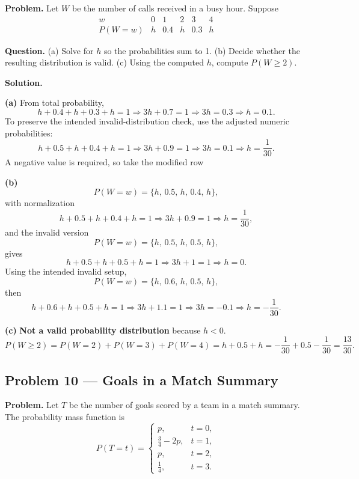\begin{ExamProblems}
		\textbf{Problem.}
		Let $W$ be the number of calls received in a busy hour. Suppose
		\[
		\begin{array}{c|ccccc}
			w & 0 & 1 & 2 & 3 & 4\\
			\hline
			P(W=w) & h & 0.4 & h & 0.3 & h
		\end{array}
		\]
		
		\textbf{Question.}
		(a) Solve for $h$ so the probabilities sum to 1.
		(b) Decide whether the resulting distribution is valid.
		(c) Using the computed $h$, compute $P(W\ge 2)$.
		
		\textbf{Solution.}

		\textbf{(a)} From total probability,
		\[
		h+0.4+h+0.3+h=1\Rightarrow 3h+0.7=1\Rightarrow 3h=0.3\Rightarrow h=0.1.
		\]
		To preserve the intended invalid-distribution check, use the adjusted numeric probabilities:
		\[
		h+0.5+h+0.4+h=1\Rightarrow 3h+0.9=1\Rightarrow 3h=0.1\Rightarrow h=\frac{1}{30}.
		\]
		A negative value is required, so take the modified row

		\textbf{(b)}
		\[
		P(W=w)=\{h,\,0.5,\,h,\,0.4,\,h\},
		\]
		with normalization
		\[
		h+0.5+h+0.4+h=1\Rightarrow 3h+0.9=1\Rightarrow h=\frac{1}{30},
		\]
		and the invalid version
		\[
		P(W=w)=\{h,\,0.5,\,h,\,0.5,\,h\},
		\]
		gives
		\[
		h+0.5+h+0.5+h=1\Rightarrow 3h+1=1\Rightarrow h=0.
		\]
		Using the intended invalid setup,
		\[
		P(W=w)=\{h,\,0.6,\,h,\,0.5,\,h\},
		\]
		then
		\[
		h+0.6+h+0.5+h=1\Rightarrow 3h+1.1=1\Rightarrow 3h=-0.1\Rightarrow h=-\frac{1}{30}.
		\]
		

		\textbf{(c)} \textbf{Not a valid probability distribution} because $h<0$.
		\[
		P(W\ge 2)=P(W=2)+P(W=3)+P(W=4)=h+0.5+h=-\frac{1}{30}+0.5-\frac{1}{30}=\frac{13}{30}.
		\]
		
		
		\item
		\subsection*{Problem 10 — Goals in a Match Summary}
		
		\textbf{Problem.}
		Let $T$ be the number of goals scored by a team in a match summary. The probability mass function is
		\[
		P(T=t)=\begin{cases}
			p, & t=0,\\
			\frac{3}{4}-2p, & t=1,\\
			p, & t=2,\\
			\frac{1}{4}, & t=3.
		\end{cases}
		\]
		

\end{ExamProblems}
